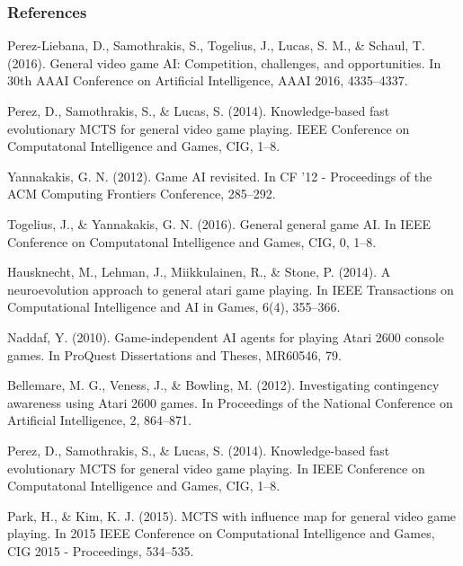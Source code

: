 \documentclass{beamer}
\begin{document}
\begin{frame}[allowframebreaks]
  \frametitle{References}
  \footnotesize{
    \begin{thebibliography}{99} %
      Perez-Liebana, D., Samothrakis, S., Togelius, J., Lucas, S. M., \& Schaul, T. (2016).
      \newblock General video game AI: Competition, challenges, and opportunities.
      \newblock In 30th AAAI Conference on Artificial Intelligence, AAAI 2016, 4335–4337.

      Perez, D., Samothrakis, S., \& Lucas, S. (2014).
      \newblock Knowledge-based fast evolutionary MCTS for general video game playing.
      \newblock IEEE Conference on Computatonal Intelligence and Games, CIG, 1–8.


      Yannakakis, G. N. (2012).
      \newblock Game AI revisited.
      \newblock In CF ’12 - Proceedings of the ACM Computing Frontiers Conference, 285–292.

      Togelius, J., \& Yannakakis, G. N. (2016).
      \newblock General general game AI.
      \newblock In IEEE Conference on Computatonal Intelligence and Games, CIG, 0, 1–8.

      Hausknecht, M., Lehman, J., Miikkulainen, R., \& Stone, P. (2014).
      \newblock A neuroevolution approach to general atari game playing.
      \newblock In IEEE Transactions on Computational Intelligence and AI in Games, 6(4), 355–366.

      Naddaf, Y. (2010).
      \newblock Game-independent AI agents for playing Atari 2600 console games.
      \newblock In ProQuest Dissertations and Theses, MR60546, 79.

      Bellemare, M. G., Veness, J., \& Bowling, M. (2012).
      \newblock Investigating contingency awareness using Atari 2600 games.
      \newblock In Proceedings of the National Conference on Artificial Intelligence, 2, 864–871.

      Perez, D., Samothrakis, S., \& Lucas, S. (2014).
      \newblock Knowledge-based fast evolutionary MCTS for general video game playing.
      \newblock In IEEE Conference on Computatonal Intelligence and Games, CIG, 1–8.

      Park, H., \& Kim, K. J. (2015).
      \newblock MCTS with influence map for general video game playing.
      \newblock In 2015 IEEE Conference on Computational Intelligence and Games, CIG 2015 - Proceedings, 534–535.


\end{thebibliography}}
\end{frame}
\end{document}

